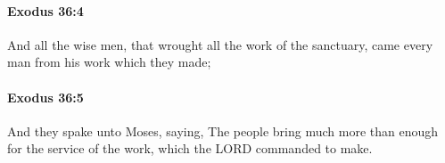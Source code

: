 		\paragraph{Exodus 36:4} %
			\label{EXODUS-36-4}

			And all the wise men, that wrought all the work of the sanctuary, came every man from his work which they made;


		\paragraph{Exodus 36:5} %
			\label{EXODUS-36-5}

			And they spake unto Moses, saying, The people bring much more than enough for the service of the work, which the LORD commanded to make.



